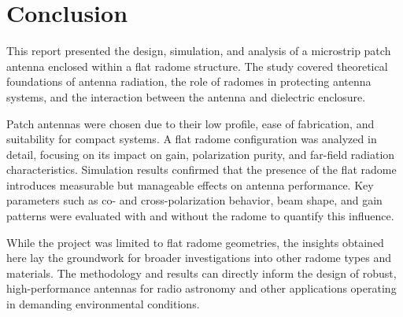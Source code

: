 \chapter{Conclusion}

This report presented the design, simulation, and analysis of a microstrip patch antenna enclosed within a flat radome structure. The study covered theoretical foundations of antenna radiation, the role of radomes in protecting antenna systems, and the interaction between the antenna and dielectric enclosure.

Patch antennas were chosen due to their low profile, ease of fabrication, and suitability for compact systems. A flat radome configuration was analyzed in detail, focusing on its impact on gain, polarization purity, and far-field radiation characteristics. Simulation results confirmed that the presence of the flat radome introduces measurable but manageable effects on antenna performance. Key parameters such as co- and cross-polarization behavior, beam shape, and gain patterns were evaluated with and without the radome to quantify this influence.

While the project was limited to flat radome geometries, the insights obtained here lay the groundwork for broader investigations into other radome types and materials. The methodology and results can directly inform the design of robust, high-performance antennas for radio astronomy and other applications operating in demanding environmental conditions.
